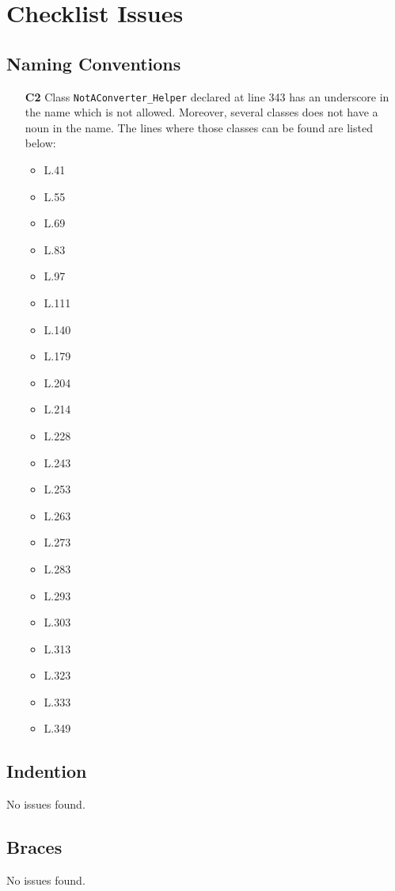 \section{Checklist Issues}

\subsection{Naming Conventions}
	\begin{itemize}
		\item[\textbf{C2}] Class \texttt{NotAConverter\_Helper} declared at line 343 has an underscore in the name which is not allowed. Moreover, several classes does not have a noun in the name. The lines where those classes can be found are listed below:
		\begin{itemize}
			\item L.41
			\item L.55
			\item L.69
			\item L.83
			\item L.97
			\item L.111
			\item L.140
			\item L.179
			\item L.204
			\item L.214
			\item L.228
			\item L.243
			\item L.253
			\item L.263
			\item L.273
			\item L.283
			\item L.293
			\item L.303
			\item L.313
			\item L.323
			\item L.333
			\item L.349
		\end{itemize}
	\end{itemize}

\subsection{Indention}
No issues found.

\subsection{Braces}
No issues found.

